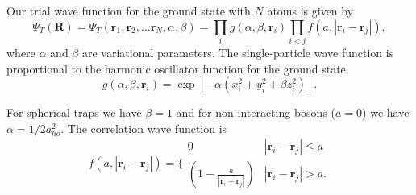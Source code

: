 \documentclass[%
oneside,                 %
final,                   %
10pt]{article}
\begin{document}
 Our trial wave function for the ground state with $N$ atoms is given by
 \begin{equation}
 \Psi_T(\mathbf{R})=\Psi_T(\mathbf{r}_1, \mathbf{r}_2, \dots \mathbf{r}_N,\alpha,\beta)=\prod_i g(\alpha,\beta,\mathbf{r}_i)\prod_{i<j}f(a,|\mathbf{r}_i-\mathbf{r}_j|),
 \label{eq:trialwf}
 \end{equation}
 where $\alpha$ and $\beta$ are variational parameters. The
 single-particle wave function is proportional to the harmonic
 oscillator function for the ground state
\begin{equation}
    g(\alpha,\beta,\mathbf{r}_i)= \exp{[-\alpha(x_i^2+y_i^2+\beta z_i^2)]}.
 \end{equation}

For spherical traps we have $\beta = 1$ and for non-interacting
bosons ($a=0$) we have $\alpha = 1/2a_{ho}^2$.  The correlation wave
 function is
 \begin{equation}
    f(a,|\mathbf{r}_i-\mathbf{r}_j|)=\Bigg\{
 \begin{array}{ll}
	 0 & {|\mathbf{r}_i-\mathbf{r}_j|} \leq {a}\\
	 (1-\frac{a}{|\mathbf{r}_i-\mathbf{r}_j|}) & {|\mathbf{r}_i-\mathbf{r}_j|} > {a}.
 \end{array}
 \end{equation}  
\end{document}
